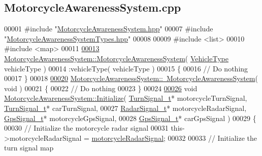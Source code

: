 \hypertarget{MotorcycleAwarenessSystem_8cpp_source}{\subsection{Motorcycle\-Awareness\-System.\-cpp}
}

\begin{DoxyCode}
00001 \textcolor{preprocessor}{#include "\hyperlink{MotorcycleAwarenessSystem_8hpp}{MotorcycleAwarenessSystem.hpp}"}
00007 \textcolor{preprocessor}{#include "\hyperlink{MotorcycleAwarenessSystemTypes_8hpp}{MotorcycleAwarenessSystemTypes.hpp}"}
00008 
00009 \textcolor{preprocessor}{#include <list>}
00010 \textcolor{preprocessor}{#include <map>}
00011 
\hypertarget{MotorcycleAwarenessSystem_8cpp_source_l00013}{}\hyperlink{classMotorcycleAwarenessSystem_ab0fb3823809dc056fecc82cc72a80a55}{00013} \hyperlink{classMotorcycleAwarenessSystem_ab0fb3823809dc056fecc82cc72a80a55}{MotorcycleAwarenessSystem::MotorcycleAwarenessSystem}( 
      \hyperlink{MotorcycleAwarenessSystemTypes_8hpp_a0c05c42b98a847f971385c81c2a81afa}{VehicleType} vehicleType )
00014     :vehicleType( vehicleType )
00015 \{
00016     \textcolor{comment}{// Do nothing}
00017 \}
00018 
\hypertarget{MotorcycleAwarenessSystem_8cpp_source_l00020}{}\hyperlink{classMotorcycleAwarenessSystem_a89ce16a722b3575e1415cbe9c7eedbd3}{00020} \hyperlink{classMotorcycleAwarenessSystem_a89ce16a722b3575e1415cbe9c7eedbd3}{MotorcycleAwarenessSystem::~MotorcycleAwarenessSystem}(
       \textcolor{keywordtype}{void} )
00021 \{
00022     \textcolor{comment}{// Do nothing}
00023 \}
00024 
\hypertarget{MotorcycleAwarenessSystem_8cpp_source_l00026}{}\hyperlink{classMotorcycleAwarenessSystem_a826b6c2286c494c8aca3a47e6430b3ff}{00026} \textcolor{keywordtype}{void} \hyperlink{classMotorcycleAwarenessSystem_a826b6c2286c494c8aca3a47e6430b3ff}{MotorcycleAwarenessSystem::Initialize}( 
      \hyperlink{structTurnSignal__t}{TurnSignal\_t}* motorcycleTurnSignal, \hyperlink{structTurnSignal__t}{TurnSignal\_t}* carTurnSignal,
00027                                             \hyperlink{structRadarSignal__t}{RadarSignal\_t}* motorcycleRadarSignal, 
      \hyperlink{structGpsSignal__t}{GpsSignal\_t}* motorcycleGpsSignal,
00028                                             \hyperlink{structGpsSignal__t}{GpsSignal\_t}* carGpsSignal  )
00029 \{
00030     \textcolor{comment}{// Initialize the motorcycle radar signal}
00031     this->motorcycleRadarSignal = \hyperlink{classMotorcycleAwarenessSystem_a0744e71b9f440a86f5078c876ba7629b}{motorcycleRadarSignal};
00032 
00033     \textcolor{comment}{// Initialize the turn signal map}

\end{DoxyCode}
